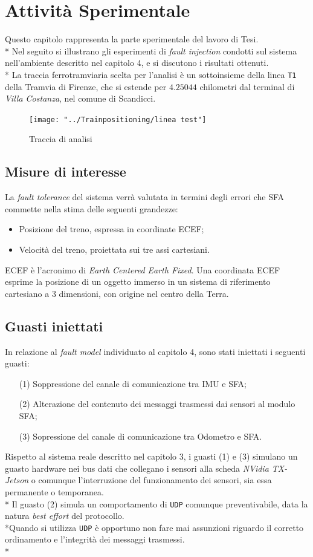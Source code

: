 \chapter{Attivit\`a Sperimentale}
Questo capitolo rappresenta la parte sperimentale del lavoro di Tesi.\\*
Nel seguito si illustrano gli esperimenti di \emph{fault injection} condotti sul sistema nell'ambiente descritto nel capitolo 4, e si discutono i risultati ottenuti.\\*
La traccia ferrotramviaria scelta per l'analisi \`e un sottoinsieme della linea \texttt{T1} della Tramvia di Firenze, che si estende per $4.25044$ chilometri dal terminal di \emph{Villa Costanza}, nel comune di Scandicci. 
\begin{figure}[h]
	\centering
	\texttt{[image: "../Trainpositioning/linea test"]}
	\caption{Traccia di analisi}
	\label{fig:linea-test}
\end{figure}
\section{Misure di interesse}
La \emph{fault tolerance} del sistema verr\`a valutata in termini degli errori che SFA commette nella stima delle seguenti grandezze:
\begin{itemize}
	\item Posizione del treno, espressa in coordinate ECEF;
	\item Velocit\`a del treno, proiettata sui tre assi cartesiani.
\end{itemize}
ECEF \`e l'acronimo di \emph{Earth Centered Earth Fixed}. Una coordinata ECEF esprime la posizione di un oggetto immerso in un sistema di riferimento cartesiano a 3 dimensioni, con origine nel centro della Terra.
\section{Guasti iniettati}
In relazione al \emph{fault model} individuato al capitolo 4, sono stati iniettati i seguenti guasti:
\begin{enumerate}
	\item[(1)] Soppressione del canale di comunicazione tra IMU e SFA;
	\item[(2)] Alterazione del contenuto dei messaggi trasmessi dai sensori al modulo SFA;
	\item[(3)] Sopressione del canale di comunicazione tra Odometro e SFA.
\end{enumerate}
Rispetto al sistema reale descritto nel capitolo 3, i guasti (1) e (3) simulano un guasto hardware nei bus dati che collegano i sensori alla scheda \emph{NVidia TX-Jetson} o comunque l'interruzione del funzionamento dei sensori, sia essa permanente o temporanea.\\*
Il guasto (2) simula un comportamento di \texttt{UDP} comunque preventivabile, data la natura \emph{best effort} del protocollo.\\*Quando si utilizza \texttt{UDP} \`e opportuno non fare mai assunzioni riguardo il corretto ordinamento e l'integrit\`a dei messaggi trasmessi.\\*
